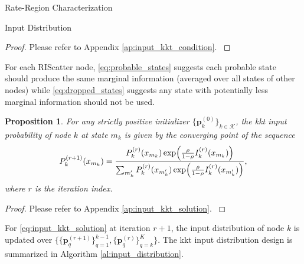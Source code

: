 \documentclass[journal]{IEEEtran}
\newtheorem{proposition}{Proposition}
\begin{document}
\begin{section}{Rate-Region Characterization}
\begin{subsection}{Input Distribution}
		\begin{proof}
			Please refer to Appendix \ref{ap:input_kkt_condition}.
			\label{pf:input_kkt_condition}
		\end{proof}

		For each RIScatter node, \eqref{eq:probable_states} suggests each probable state should produce the same marginal information (averaged over all states of other nodes) while \eqref{eq:dropped_states} suggests any state with potentially less marginal information should not be used.
		\begin{proposition}
			For any strictly positive initializer $\{\boldsymbol{p}_k^{(0)}\}_{k \in \mathcal{K}}$, the \gls{kkt} input probability of node $k$ at state $m_k$ is given by the converging point of the sequence
			\begin{equation}
				P_k^{(r+1)}(x_{m_k}) = \frac{P_k^{(r)}(x_{m_k}) \exp \Bigl( \frac{\rho}{1 - \rho} I_k^{(r)}(x_{m_k}) \Bigr)}{\sum_{m_k'} P_k^{(r)}(x_{m_k'}) \exp \Bigl( \frac{\rho}{1 - \rho} I_k^{(r)}(x_{m_k'}) \Bigr)},
				\label{eq:input_kkt_solution}
			\end{equation}
			where $r$ is the iteration index.
			\label{pr:input_kkt_solution}
		\end{proposition}
		\begin{proof}
			Please refer to Appendix \ref{ap:input_kkt_solution}.
			\label{pf:input_kkt_solution}
		\end{proof}

		For \eqref{eq:input_kkt_solution} at iteration $r+1$, the input distribution of node $k$ is updated over $\bigl\{\{\boldsymbol{p}_q^{(r+1)}\}_{q=1}^{k-1},\{\boldsymbol{p}_q^{(r)}\}_{q=k}^{K}\bigr\}$.
		The \gls{kkt} input distribution design is summarized in Algorithm \ref{al:input_distribution}.


\end{subsection}
\end{section}
\end{document}
